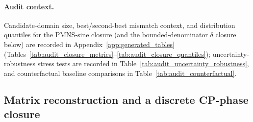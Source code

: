 \begin{table}[t]
\centering
\small
\setlength{\tabcolsep}{8pt}
\renewcommand{\arraystretch}{1.15}
%
\caption{NO/IO robustness diagnostic for the PMNS closures at $(m,n)=(6,3)$: we rerun the bounded-complexity minimizers at $B=20$ (angles) and $Q=12$ (phase) against representative normal- and inverted-ordering reference targets (PDG conventions). Rows are reproduced by the deterministic script \texttt{scripts/exp\_pmns\_no\_io\_stability.py}.}
\label{tab:pmns_no_io_stability}
\end{table}

\paragraph{Audit context.}
Candidate-domain size, best/second-best mismatch context, and distribution quantiles for the PMNS-sine closure (and the bounded-denominator $\delta$ closure below) are recorded in Appendix~\ref{app:generated_tables} (Tables~\ref{tab:audit_closure_metrics}--\ref{tab:audit_closure_quantiles}); uncertainty-robustness stress tests are recorded in Table~\ref{tab:audit_uncertainty_robustness}, and counterfactual baseline comparisons in Table~\ref{tab:audit_counterfactual}.

\subsection{Matrix reconstruction and a discrete CP-phase closure}

